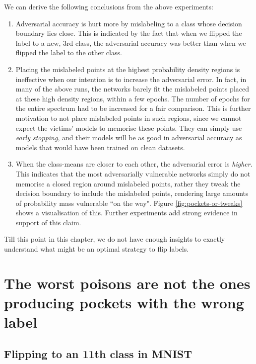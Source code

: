 \documentclass{ociamthesis}
\begin{document}
We can derive the following conclusions from the above experiments:
\begin{enumerate}
    \item Adversarial accuracy is hurt more by mislabeling to a class whose
    decision boundary lies close. This is indicated by the fact that when we
    flipped the label to a new, 3rd class, the adversarial accuracy was better
    than when we flipped the label to the other class.
    \item Placing the mislabeled points at the highest probability density
    regions is ineffective when our intention is to increase the adversarial
    error. In fact, in many of the above runs, the networks barely fit the
    mislabeled points placed at these high density regions, within a few epochs.
    The number of epochs for the entire spectrum had to be increased for a fair
    comparison. This is further motivation to not place mislabeled points in
    such regions, since we cannot expect the victims' models to memorise these
    points. They can simply use \emph{early stopping}, and their models will be
    as good in adversarial accuracy as models that would have been trained on
    clean datasets.
    \item When the class-means are closer to each other, the adversarial error
    is \emph{higher}. This indicates that the most adversarially vulnerable
    networks simply do not memorise a closed region around mislabeled points,
    rather they tweak the decision boundary to include the mislabeled points,
    rendering large amounts of probability mass vulnerable ``on the way". Figure
    \ref{fig:pockets-or-tweaks} shows a visualisation of this. Further
    experiments add strong evidence in support of this claim.
\end{enumerate}

Till this point in this chapter, we do not have enough insights to exactly
understand what might be an optimal strategy to flip labels.


\section{The worst poisons are not the ones producing pockets with the wrong label}


\subsection{Flipping to an 11th class in MNIST}
\end{document}
